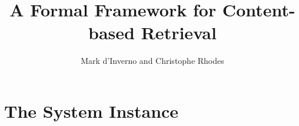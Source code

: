 \documentclass[11pt]{article}
\title{A Formal Framework for Content-based Retrieval}
\author{Mark d'Inverno and Christophe Rhodes}
\begin{document}
\maketitle




\section{The System Instance}

\newcommand{\mylet}{\methrel{\sf Let}}
\newcommand{\FV}{\mathrel{~FV}}
\newcommand{\V}{\mathrel{~FV^{d}}}
\newcommand{\U}{\mathrel{~FV^{1}}}
\newcommand{\R}{\mathrel{~R}}

\newcommand{\mylog}{\mathrel{ln}}
\end{document}
